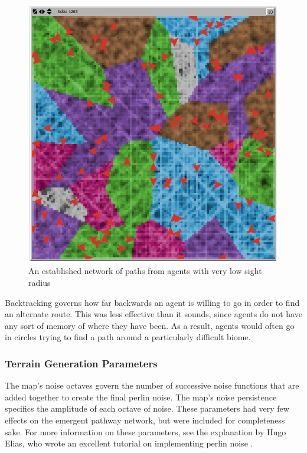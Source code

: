 \documentclass[conference]{IEEEtran}
\begin{document}
\begin{figure}[h]
\begin{center}
\includegraphics[scale=0.4]{image/results6}
\end{center}
\caption{An established network of paths from agents with very low sight radius}
\end{figure}

Backtracking governs how far backwards an agent is willing to go in order to find an alternate route. This was less effective than it sounds, since agents do not have any sort of memory of where they have been. As a result, agents would often go in circles trying to find a path around a particularly difficult biome. 

\subsubsection{Terrain Generation Parameters}
The map's noise octaves govern the number of successive noise functions that are added together to create the final perlin noise. The map's noise persistence specifics the amplitude of each octave of noise. These parameters had very few effects on the emergent pathway network, but were included for completeness sake. For more information on these parameters, see the explanation by Hugo Elias, who wrote an excellent tutorial on implementing perlin noise \cite{elias:perlin}.
\end{document}
